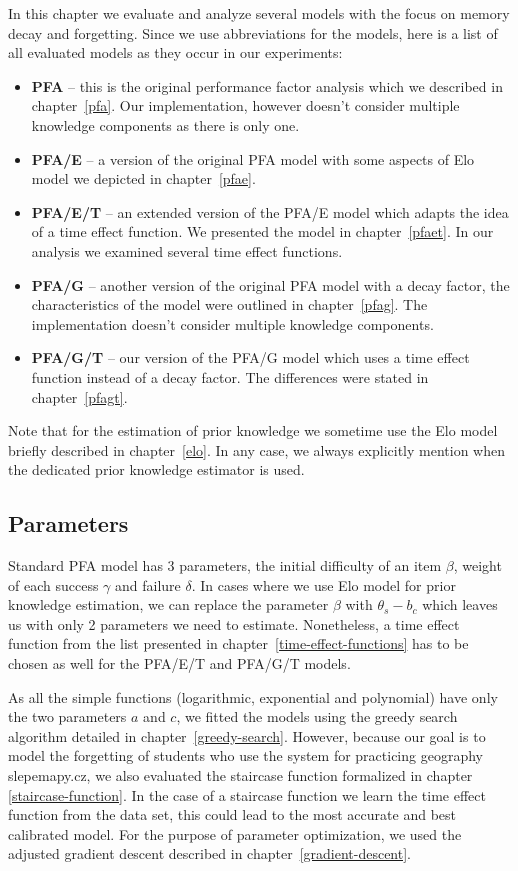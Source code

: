 In this chapter we evaluate and analyze several models with the focus on memory decay and forgetting. Since we use abbreviations for the models, here is a list of all evaluated models as they occur in our experiments:

\begin{itemize}
  \item \textbf{PFA} -- this is the original performance factor analysis which we described in chapter~\ref{pfa}. Our implementation, however doesn't consider multiple knowledge components as there is only one.
  \item \textbf{PFA/E} -- a version of the original PFA model with some aspects of Elo model we depicted in chapter~\ref{pfae}.
  \item \textbf{PFA/E/T} -- an extended version of the PFA/E model which adapts the idea of a time effect function. We presented the model in chapter~\ref{pfaet}. In our analysis we examined several time effect functions.
  \item \textbf{PFA/G} -- another version of the original PFA model with a decay factor, the characteristics of the model were outlined in chapter~\ref{pfag}. The implementation doesn't consider multiple knowledge components.
  \item \textbf{PFA/G/T} -- our version of the PFA/G model which uses a time effect function instead of a decay factor. The differences were stated in chapter~\ref{pfagt}.
\end{itemize}

Note that for the estimation of prior knowledge we sometime use the Elo model briefly described in chapter~\ref{elo}. In any case, we always explicitly mention when the dedicated prior knowledge estimator is used.

\subsection{Parameters}
\label{parameters}

Standard PFA model has 3 parameters, the initial difficulty of an item $\beta$, weight of each success $\gamma$ and failure $\delta$. In cases where we use Elo model for prior knowledge estimation, we can replace the parameter $\beta$ with $\theta_s - b_c$ which leaves us with only 2 parameters we need to estimate. Nonetheless, a time effect function from the list presented in chapter~\ref{time-effect-functions} has to be chosen as well for the PFA/E/T and PFA/G/T models.

As all the simple functions (logarithmic, exponential and polynomial) have only the two parameters $a$ and $c$, we fitted the models using the greedy search algorithm detailed in chapter~\ref{greedy-search}. However, because our goal is to model the forgetting of students who use the system for practicing geography slepemapy.cz, we also evaluated the staircase function formalized in chapter \ref{staircase-function}. In the case of a staircase function we learn the time effect function from the data set, this could lead to the most accurate and best calibrated model. For the purpose of parameter optimization, we used the adjusted gradient descent described in chapter~\ref{gradient-descent}.

